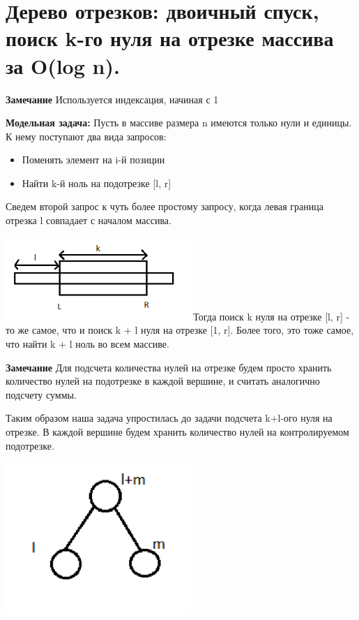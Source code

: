 \section{Дерево отрезков: двоичный спуск, поиск k-го нуля на отрезке массива за O(log n).}


\textbf{Замечание} Используется индексация, начиная с 1

\textbf{Модельная задача:} Пусть в массиве размера n имеются только нули и единицы. К нему поступают два вида запросов:
\begin{itemize}
    \item Поменять элемент на i-й позиции
    \item Найти k-й ноль на подотрезке [l, r]
\end{itemize}

Сведем второй запрос к чуть более простому запросу, когда левая граница отрезка l совпадает с началом массива.

\includegraphics[width=7cm]{images/60-62_2searck}
Тогда поиск k нуля на отрезке [l, r] - то же самое, что и поиск k + l нуля на отрезке [1, r]. Более того, это тоже самое, что найти k + l ноль во всем массиве.

\textbf{Замечание } Для подсчета количества нулей на отрезке будем просто хранить количество нулей на подотрезке в каждой вершине, и считать аналогично подсчету суммы.

Таким образом наша задача упростилась до задачи подсчета k+l-ого нуля на отрезке.
 В каждой вершине будем хранить количество нулей на контролируемом подотрезке.
 
 \includegraphics[width=7cm]{images/60-62_seakch2}
 
